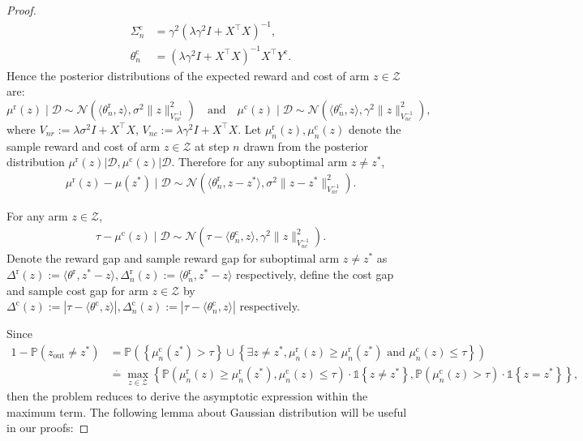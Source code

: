 \documentclass[accepted]{uai2025} %
\theoremstyle{plain}
\theoremstyle{definition}
\theoremstyle{remark}
\newcommand{\thetac}{\theta^{\mathrm{c}}}
\newcommand{\Deltac}{\Delta^{\mathrm{c}}}
\newcommand{\Deltar}{\Delta^{\mathrm{r}}}
\newcommand{\thetar}{\theta^{\mathrm{r}}}
\newcommand{\muc}{\mu^{\mathrm{c}}}
\newcommand{\mur}{\mu^{\mathrm{r}}}
\newcommand{\PP}{\mathbb{P}} %
\newcommand{\cbr}[1]{\left\{#1\right\}}
\newcommand*{\one}{\mathds{1}}
\def\cd{\cdot}
\begin{document}
\begin{proof}
\begin{align*}
    \Sigma^{\mathrm{c}}_n&=\gamma^2\left( \lambda \gamma^2 I +  X^\top X \right)^{-1},\\
    \theta^{\mathrm{c}}_n &= \left( \lambda \gamma^2 I +  X^\top X \right)^{-1}   X^\top Y^{\mathrm{c}} .
\end{align*}
Hence the posterior distributions of the expected reward and cost of arm $z\in \mathcal{Z}$ are:
\[
\mur(z) \mid \mathcal{D} \sim \mathcal{N}(\langle \thetar_n, z\rangle, \sigma^2 \lVert z \rVert^2_{V^{-1}_{nr}})
\quad\mbox{and}\quad
\muc(z) \mid \mathcal{D} \sim \mathcal{N}(\langle \thetac_n, z\rangle, \gamma^2 \lVert z \rVert^2_{V^{-1}_{nc}}),
\]
where $V_{nr}:=\lambda \sigma^2 I +  X^\top X$, $V_{nc}:=\lambda \gamma^2 I +  X^\top X$. Let $\mu_n^{\mathrm{r}}(z), \mu_n^{\mathrm{c}}(z)$ denote the sample reward and cost of arm $z\in \mathcal{Z}$ at step $n$ drawn from the posterior distribution $\mur(z)|\mathcal{D}, \muc(z)|\mathcal{D}$. 
Therefore for any suboptimal arm $z\neq z^*$,
\begin{align*}
    \mur(z)-\mu(z^*) \mid \mathcal{D} \sim \mathcal{N}(\langle \thetar_n, z-z^*\rangle, \sigma^2 \lVert z-z^* \rVert^2_{V^{-1}_{nr}}).
\end{align*}

For any arm $z\in\mathcal{Z}$, 
\begin{align*}
    \tau-\muc(z) \mid \mathcal{D} \sim \mathcal{N}(\tau-\langle \thetac_n, z\rangle, \gamma^2 \lVert z \rVert^2_{V^{-1}_{nc}}).
\end{align*}
Denote the reward gap and sample reward gap for suboptimal arm $z\neq z^*$ as $\Deltar(z):=\langle \thetar, z^*-z\rangle, \Deltar_n(z):=\langle \thetar_n, z^*-z\rangle$ respectively,  define the cost gap and sample cost gap for arm $z\in\mathcal{Z}$ by $\Deltac(z):= |\tau-\langle \thetac, z\rangle|, \Deltac_n(z):= |\tau-\langle \thetac_n, z\rangle|$ respectively. 


Since 
\begin{align*}
    1-\PP(z_{\text{out}}\neq z^*)&=\PP(\cbr{\mu_n^{\mathrm{c}}(z^*)>\tau}\cup \cbr{\exists z\neq z^*, \mu_n^{\mathrm{r}}(z)\ge\mu_n^{\mathrm{r}}(z^*) \mbox{ and } \mu_n^{\mathrm{c}}(z)\le \tau})
    \\&\stackrel{\cdot}{=}\max_{z\in \mathcal{Z}} \cbr{\PP(\mur_{n}(z)\ge \mur_{n}(z^*), \muc_{n}(z)\le \tau)\cd \one \cbr{z\neq z^*}, \PP (\muc_{n}(z)>\tau) \cd \one \cbr{z=z^*}},
\end{align*}
then the problem reduces to derive the asymptotic expression within the maximum term. The following lemma about Gaussian distribution will be useful in our proofs: 


\end{proof}
\end{document}
